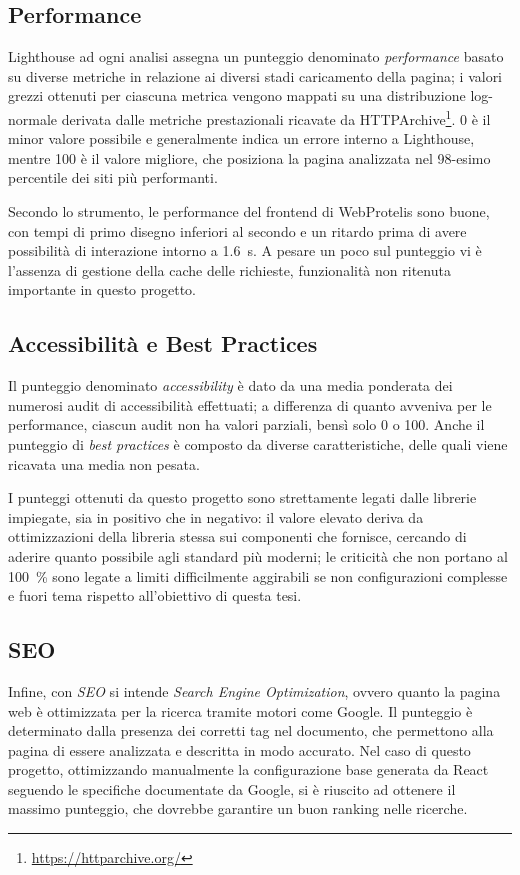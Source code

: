     \subsection{Performance}
      Lighthouse ad ogni analisi assegna un punteggio denominato \emph{performance} basato su diverse metriche in relazione ai diversi stadi caricamento della pagina;
      i valori grezzi ottenuti per ciascuna metrica vengono mappati su una distribuzione log-normale derivata dalle metriche prestazionali ricavate da HTTPArchive\footnote{\url{https://httparchive.org/}}.
      0 è il minor valore possibile e generalmente indica un errore interno a Lighthouse, mentre 100 è il valore migliore, che posiziona la pagina analizzata nel 98-esimo percentile dei siti più performanti.

      Secondo lo strumento, le performance del frontend di WebProtelis sono buone, con tempi di primo disegno inferiori al secondo e un ritardo prima di avere possibilità di interazione intorno a \SI{1.6}{\second}.
      A pesare un poco sul punteggio vi è l'assenza di gestione della cache delle richieste, funzionalità non ritenuta importante in questo progetto.

    \subsection{Accessibilità e Best Practices}

    Il punteggio denominato \emph{accessibility} è dato da una media ponderata dei numerosi audit di accessibilità effettuati;
    a differenza di quanto avveniva per le performance, ciascun audit non ha valori parziali, bensì solo 0 o 100.
    Anche il punteggio di \emph{best practices} è composto da diverse caratteristiche, delle quali viene ricavata una media non pesata.

    I punteggi ottenuti da questo progetto sono strettamente legati dalle librerie impiegate, sia in positivo che in negativo:
    il valore elevato deriva da ottimizzazioni della libreria stessa sui componenti che fornisce, cercando di aderire quanto possibile agli standard più moderni;
    le criticità che non portano al \SI{100}{\percent} sono legate a limiti difficilmente aggirabili se non configurazioni complesse e fuori tema rispetto all'obiettivo di questa tesi.

    \subsection{SEO}

    Infine, con \emph{SEO} si intende \emph{\emph{S}earch \emph{E}ngine \emph{O}ptimization}, ovvero quanto la pagina web è ottimizzata per la ricerca tramite motori come Google.
    Il punteggio è determinato dalla presenza dei corretti tag nel documento, che permettono alla pagina di essere analizzata e descritta in modo accurato.
    Nel caso di questo progetto, ottimizzando manualmente la configurazione base generata da React seguendo le specifiche documentate da Google, si è riuscito ad ottenere il massimo punteggio, che dovrebbe garantire un buon ranking nelle ricerche.
